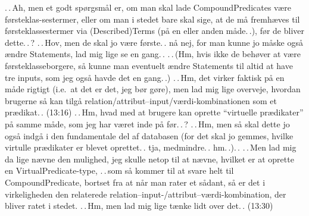 \documentclass{report}
\begin{document}
.\,.\,Ah, men et godt spørgsmål er, om man skal lade CompoundPredicates være førsteklas-sestermer, eller om man i stedet bare skal sige, at de må fremhæves til førsteklassestermer via (Described)Terms (på en eller anden måde.\,.), før de bliver dette.\,.\,? .\,.\,Hov, men de skal jo være første.\,. nå nej, for man kunne jo måske også ændre Statements, lad mig lige se en gang.\,. .\,.\,(Hm, hvis ikke de behøver at være førsteklasseborgere, så kunne man eventuelt ændre Statements til altid at have tre inputs, som jeg også havde det en gang.\,.) .\,.\,Hm, det virker faktisk på en måde rigtigt (i.e.\ at det er det, jeg bør gøre), men lad mig lige overveje, hvordan brugerne så kan tilgå relation/attribut--input/værdi-kombinationen som et prædikat.\,. (13:16) .\,.\,Hm, hvad med at brugere kan oprette ``virtuelle prædikater'' på samme måde, som jeg har været inde på før.\,.\,? .\,.\,Hm, men så skal dette jo også indgå i den fundamentale del af databasen (for det skal jo gemmes, hvilke virtulle prædikater er blevet oprettet.\,. tja, medmindre.\,. hm.\,.).\,. .\,.\,Men lad mig da lige nævne den mulighed, jeg skulle netop til at nævne, hvilket er at oprette en VirtualPredicate-type, .\,.\,som så kommer til at svare helt til CompoundPredicate, bortset fra at når man rater et sådant, så er det i virkeligheden den relaterede relation--input-/attribut--værdi-kombination, der bliver ratet i stedet. .\,.\,Hm, men lad mig lige tænke lidt over det.\,. (13:30) 
\end{document}
